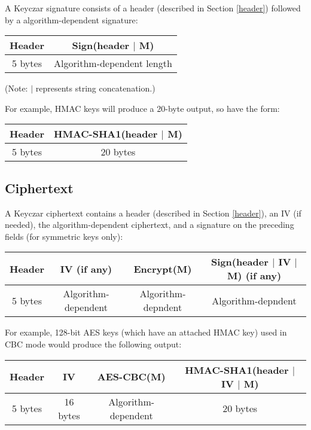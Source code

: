 \documentclass{llncs}
\begin{document}
A Keyczar signature consists of a header (described in Section \ref{header})
followed by a algorithm-dependent signature:

\vspace*{3mm}
\begin{tabular}{| c | c |}
\hline
Header & Sign(header $|$ M) \\
\hline 5 bytes & Algorithm-dependent length \\ \hline
\end{tabular}
\vspace*{3mm}

(Note: $|$ represents string concatenation.)

\vspace*{3mm}

For example, HMAC keys will produce a 20-byte output, so have the form:

\vspace*{3mm}
\begin{tabular}{| c | c |}
\hline
Header & HMAC-SHA1(header $|$ M) \\ \hline
5 bytes & 20 bytes \\ \hline
\end{tabular}
\vspace*{3mm}
\subsection{Ciphertext}

A Keyczar ciphertext contains a header (described in Section \ref{header}), an
IV (if needed), the algorithm-dependent ciphertext, and a signature on the
preceding fields (for symmetric keys only):

\vspace*{3mm}
\begin{tabular}{| c | c | c | c |}
\hline
Header & IV (if any) & Encrypt(M) & Sign(header $|$ IV $|$ M) (if any) \\ \hline
5 bytes & Algorithm-dependent & Algorithm-depndent & Algorithm-depndent \\
\hline
\end{tabular}
\vspace*{3mm}

For example, 128-bit AES keys (which have an attached HMAC key) used in CBC
mode would produce the following output:

\vspace*{3mm}
\begin{tabular}{| c | c | c | c |}
\hline
Header & IV & AES-CBC(M) & HMAC-SHA1(header $|$ IV $|$ M) \\ \hline
5 bytes & 16 bytes & Algorithm-dependent & 20 bytes \\
\hline
\end{tabular}
\vspace*{3mm}
\end{document}
